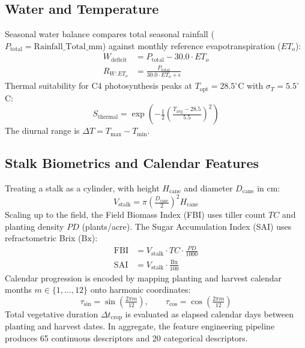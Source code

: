 \documentclass[conference,10pt,letterpaper]{IEEEtran}
\begin{document}
\subsection{Water and Temperature}
Seasonal water balance compares total seasonal rainfall ($P_{\text{total}} = \text{Rainfall\_Total\_mm}$) against monthly reference evapotranspiration ($ET_o$):
\begin{align}
W_{\text{deficit}} &= P_{\text{total}} - 30.0 \cdot ET_o \\
R_{W:ET_o} &= \frac{P_{\text{total}}}{30.0 \cdot ET_o + \epsilon}
\end{align}
Thermal suitability for C4 photosynthesis peaks at $T_{\text{opt}} = 28.5^\circ$C with $\sigma_T = 5.5^\circ$C:
\begin{equation}
S_{\text{thermal}} = \exp\!\left(-\tfrac{1}{2}\left(\tfrac{T_{\text{avg}} - 28.5}{5.5}\right)^2\right)
\end{equation}
The diurnal range is $\Delta T = T_{\max} - T_{\min}$.

\subsection{Stalk Biometrics and Calendar Features}
Treating a stalk as a cylinder, with height $H_{\text{cane}}$ and diameter $D_{\text{cane}}$ in cm:
\begin{equation}
V_{\text{stalk}} = \pi \left(\tfrac{D_{\text{cane}}}{2}\right)^2 H_{\text{cane}}
\end{equation}
Scaling up to the field, the Field Biomass Index (FBI) uses tiller count $TC$ and planting density $PD$ (plants/acre). The Sugar Accumulation Index (SAI) uses refractometric Brix ($\text{Bx}$):
\begin{align}
\text{FBI} &= V_{\text{stalk}} \cdot TC \cdot \tfrac{PD}{1000} \\
\text{SAI} &= V_{\text{stalk}} \cdot \tfrac{\text{Bx}}{100}
\end{align}
Calendar progression is encoded by mapping planting and harvest calendar months $m \in \{1, \dots, 12\}$ onto harmonic coordinates:
\begin{equation}
\tau_{\sin} = \sin\!\left(\tfrac{2\pi m}{12}\right), \qquad
\tau_{\cos} = \cos\!\left(\tfrac{2\pi m}{12}\right)
\end{equation}
Total vegetative duration $\Delta t_{\text{crop}}$ is evaluated as elapsed calendar days between planting and harvest dates. In aggregate, the feature engineering pipeline produces 65 continuous descriptors and 20 categorical descriptors.
\end{document}
